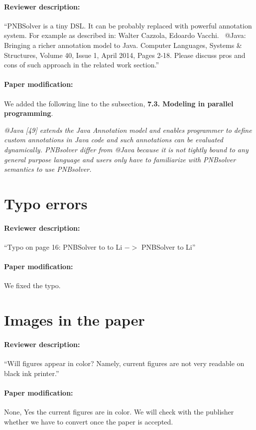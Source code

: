 \documentclass[11pt,a4paper]{article}
\begin{document}
\paragraph{Reviewer description:}``PNBSolver is a tiny DSL. It can be probably replaced with powerful annotation system. For example as described in: Walter Cazzola, Edoardo Vacchi. ~@Java: Bringing a richer annotation model to Java. Computer Languages, Systems \& Structures, Volume 40, Issue 1, April 2014, Pages 2-18. Please discuss pros and cons of such approach in the related work section.''
\paragraph{Paper modification:} We added  the following line to the subsection, \textbf{7.3. Modeling in parallel programming}.

\textit{
@Java [49] extends the Java Annotation model and enables programmer to define custom annotations in Java code and such annotations can be evaluated dynamically. PNBsolver differ from @Java because it is not tightly bound to any general purpose language and users only have to familiarize with PNBsolver semantics to use PNBsolver.
} 

\section {Typo errors}
\paragraph{Reviewer description:}``Typo on page 16:  PNBSolver to to Li $->$ PNBSolver to Li''
\paragraph{Paper modification:} We fixed the typo.

\section {Images in the paper}
\paragraph{Reviewer description:}``Will figures appear in color? Namely, current figures are not very readable on black ink printer.''
\paragraph{Paper modification:} None, Yes the current figures are in color. We will check with the publisher whether we have to convert once the paper is accepted.
\end{document}
